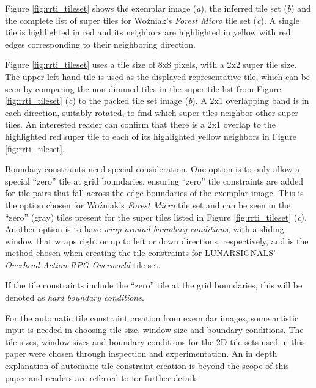 Figure \ref{fig:rrti_tileset} shows the exemplar image (\textit{a}), the inferred tile set (\textit{b}) and the complete list of super tiles
for Wo\'zniak's \textit{Forest Micro} tile set (\textit{c}).
A single tile is highlighted in red and its neighbors are highlighted in yellow with red edges corresponding to their neighboring direction.

Figure \ref{fig:rrti_tileset} uses a tile size of 8x8 pixels, with a 2x2 super tile size.
The upper left hand tile is used as the displayed representative tile, which can be seen by comparing the non dimmed tiles in the
super tile list from Figure \ref{fig:rrti_tileset} (\textit{c}) to the packed tile set image (\textit{b}).
A 2x1 overlapping band is in each direction, suitably rotated, to find which super tiles neighbor other super tiles.
An interested reader can confirm that there is a 2x1 overlap to the highlighted red super tile to each of its highlighted yellow neighbors
in Figure \ref{fig:rrti_tileset}.

Boundary constraints need special consideration.
One option is to only allow a special ``zero'' tile at grid boundaries, ensuring ``zero'' tile constraints are added
for tile pairs that fall across the edge boundaries of the exemplar image.
This is the option chosen for Wo\'zniak's \textit{Forest Micro} tile set and can be seen in the ``zero'' (gray) tiles present for
the super tiles listed in Figure \ref{fig:rrti_tileset} (\textit{c}).
Another option is to have \textit{wrap around boundary conditions}, with a sliding window that wraps right or up to left or down directions, respectively,
and is the method chosen when creating the tile constraints for LUNARSIGNALS' \textit{Overhead Action RPG Overworld} tile set.

If the tile constraints include the ``zero'' tile at the grid boundaries, this will be denoted as \textit{hard boundary conditions}.


For the automatic tile constraint creation from exemplar images, some artistic input is needed in choosing tile size, window size and boundary conditions.
The tile sizes, window sizes and boundary conditions for the 2D tile sets used in this paper were chosen through inspection and experimentation.
An in depth explanation of automatic tile constraint creation is beyond the scope of this paper and readers are referred to \cite{Gumin_2016, Sherratt_2019, BorisTheBrave_wfc_2021} for further details.

